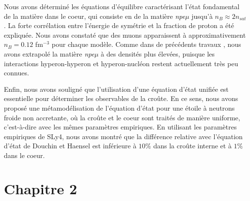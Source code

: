 Nous avons déterminé les équations d'équilibre caractérisant l'état fondamental 
de la matière dans le coeur, qui consiste en de la matière \textit{npe$\mu$} 
jusqu'à $n_B\approx 2n_{sat}$. La forte corrélation entre l'énergie de symétrie 
et la fraction de proton a été expliquée. 
Nous avons constaté que des muons apparaissent à approximativement 
$n_B = 0.12$ fm$^{-3}$ pour chaque modèle. Comme dans de précédents travaux 
\cite{Wiringa1988,Douchin2001}, nous avons extrapolé la matière 
\textit{npe$\mu$} à des densités plus élevées, puisque les interactions 
hyperon-hyperon et hyperon-nucléon restent actuellement très peu connues.

Enfin, nous avons souligné que l'utilisation d'une équation d'état unifiée 
est essentielle pour déterminer les observables de la croûte. En ce sens, nous 
avons proposé une métamodélisation de l'équation d'état pour une étoile à 
neutrons froide non accretante, où la croûte et le coeur sont traités de 
manière uniforme, c'est-à-dire avec les mêmes paramètres empiriques. 
En utilisant les paramètres empiriques de SLy4, nous avons montré que la 
différence relative avec l'équation d'état de Douchin et Haensel est inférieure 
à $10\%$ dans la croûte interne et à $1\%$ dans le coeur.

\section{Chapitre 2}

